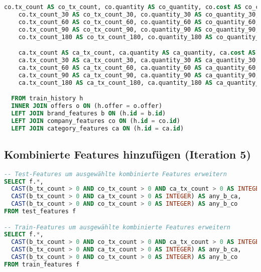 \begin{lstlisting}[language=SQL]
    co.tx_count AS co_tx_count, co.quantity AS co_quantity, co.cost AS co_cost,
    co.tx_count_30 AS co_tx_count_30, co.quantity_30 AS co_quantity_30, co.cost_30 AS co_cost_30,
    co.tx_count_60 AS co_tx_count_60, co.quantity_60 AS co_quantity_60, co.cost_60 AS co_cost_60,
    co.tx_count_90 AS co_tx_count_90, co.quantity_90 AS co_quantity_90, co.cost_90 AS co_cost_90,
    co.tx_count_180 AS co_tx_count_180, co.quantity_180 AS co_quantity_180, co.cost_180 AS co_cost_180,

    ca.tx_count AS ca_tx_count, ca.quantity AS ca_quantity, ca.cost AS ca_cost,
    ca.tx_count_30 AS ca_tx_count_30, ca.quantity_30 AS ca_quantity_30, ca.cost_30 AS ca_cost_30,
    ca.tx_count_60 AS ca_tx_count_60, ca.quantity_60 AS ca_quantity_60, ca.cost_60 AS ca_cost_60,
    ca.tx_count_90 AS ca_tx_count_90, ca.quantity_90 AS ca_quantity_90, ca.cost_90 AS ca_cost_90,
    ca.tx_count_180 AS ca_tx_count_180, ca.quantity_180 AS ca_quantity_180, ca.cost_180 AS ca_cost_180

  FROM train_history h
  INNER JOIN offers o ON (h.offer = o.offer)
  LEFT JOIN brand_features b ON (h.id = b.id)
  LEFT JOIN company_features co ON (h.id = co.id)
  LEFT JOIN category_features ca ON (h.id = ca.id)
\end{lstlisting}

\subsection{Kombinierte Features hinzufügen (Iteration 5)}

\begin{lstlisting}[language=SQL]
-- Test-Features um ausgewählte kombinierte Features erweitern
SELECT f.*, 
  CAST(b_tx_count > 0 AND co_tx_count > 0 AND ca_tx_count > 0 AS INTEGER) AS any_b_co_ca,
  CAST(b_tx_count > 0 AND ca_tx_count > 0 AS INTEGER) AS any_b_ca,
  CAST(b_tx_count > 0 AND co_tx_count > 0 AS INTEGER) AS any_b_co
FROM test_features f

-- Train-Features um ausgewählte kombinierte Features erweitern
SELECT f.*, 
  CAST(b_tx_count > 0 AND co_tx_count > 0 AND ca_tx_count > 0 AS INTEGER) AS any_b_co_ca,
  CAST(b_tx_count > 0 AND ca_tx_count > 0 AS INTEGER) AS any_b_ca,
  CAST(b_tx_count > 0 AND co_tx_count > 0 AS INTEGER) AS any_b_co
FROM train_features f
\end{lstlisting}

